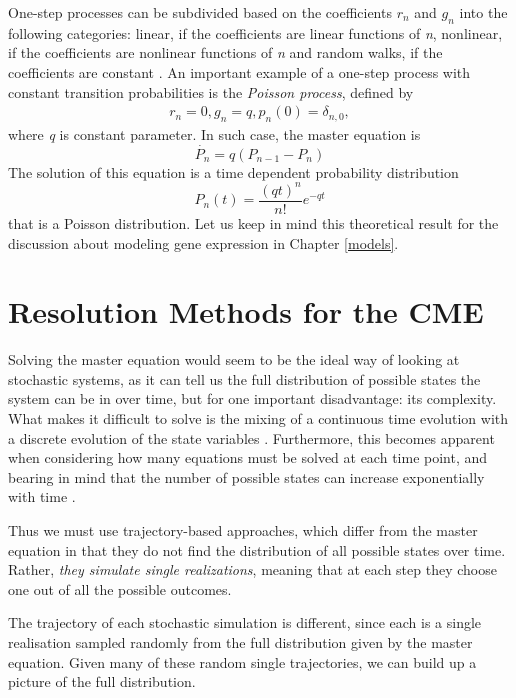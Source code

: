 \documentclass[12pt,a4paper]{report}
\begin{document}
One-step processes can be subdivided based on the coefficients $r_{n}$ and $g_{n}$ into the following categories: linear, if the coefficients are linear functions of \emph{n}, nonlinear, if the coefficients are nonlinear functions of \emph{n} and random walks, if the coefficients are constant \cite{Ragazza,Math}.
\newline
An important example of a one-step process with constant transition probabilities is the \emph{Poisson process}, defined by
\begin{align}
    r_{n} = 0,g_{n}=q,p_{n}(0)=\delta_{n,0},
\end{align}
where \emph{q} is constant parameter. In such case, the master equation is
\begin{equation}
    \dot{P_{n}} = q(P_{n-1}-P_{n})
\end{equation}
The solution of this equation is a time dependent probability distribution
\begin{equation}
    P_{n}(t) = \frac{(qt)^{n}}{n!}e^{-qt}
\end{equation}
that is a Poisson distribution. Let us keep in mind this theoretical result for the discussion about modeling gene expression in Chapter \ref{models}.  

\section{Resolution Methods for the CME}

Solving the master equation would seem to be the ideal way of looking at stochastic systems, as it can tell us the full distribution of possible states the system can be in over time, but for one important disadvantage: its complexity.  What makes it difficult to solve is the mixing of a continuous time evolution with a discrete evolution of the state variables \cite{SanDiegoUniversity}. Furthermore, this becomes apparent when considering how many equations must be solved at each time point, and bearing in mind that the number of possible states can increase exponentially with time \cite{Article}. 
 
Thus we must use trajectory-based approaches, which differ from the master equation in that they do not find the distribution of all possible states over time. Rather, \emph{they simulate single realizations}, meaning that at each step they choose one out of all the possible outcomes.

The trajectory of each stochastic simulation is different, since each is a single realisation sampled randomly from the full distribution given by the master equation. Given many of these random single trajectories, we can build up a picture of the full distribution.
\end{document}
